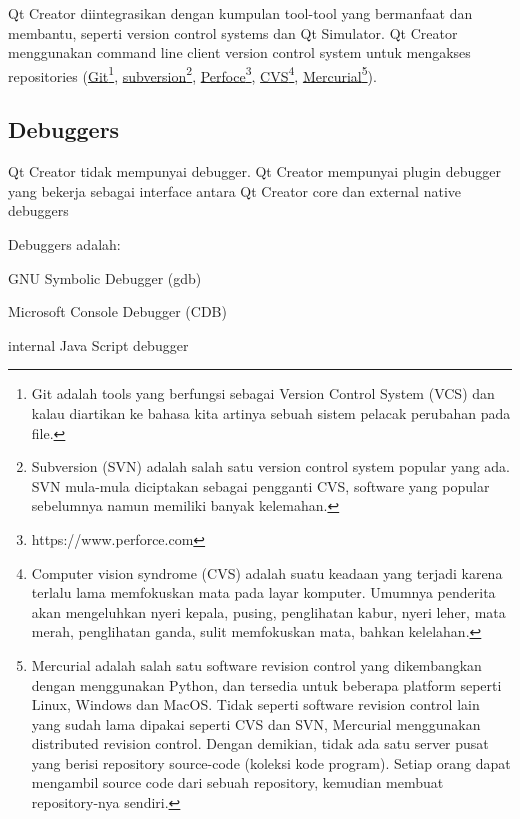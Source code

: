 Qt Creator diintegrasikan dengan kumpulan tool-tool yang bermanfaat dan
membantu, seperti version control systems dan Qt Simulator. Qt Creator
menggunakan command line client version control system untuk mengakses
repositories (\href{https://git-scm.com/}{Git}\footnote{Git adalah tools 
yang berfungsi sebagai Version Control System (VCS) dan kalau diartikan 
ke bahasa kita artinya sebuah sistem pelacak perubahan pada file.},
\href{https://subversion.apache.org/}{subversion}\footnote{Subversion
(SVN) adalah salah satu version control system popular yang ada. 
SVN mula-mula diciptakan sebagai pengganti CVS, software yang 
popular sebelumnya namun memiliki banyak kelemahan.},
\href{https://www.perforce.com}{Perfoce}\footnote{https://www.perforce.com},
\href{www.nongnu.org/cvs/}{CVS}\footnote{Computer vision syndrome (CVS) adalah suatu keadaan yang terjadi karena terlalu lama memfokuskan mata pada layar komputer. Umumnya penderita akan mengeluhkan nyeri kepala, pusing, penglihatan kabur, nyeri leher, mata merah, penglihatan ganda, sulit memfokuskan mata, bahkan kelelahan.},
\href{https://www.mercurial-scm.org}{Mercurial}\footnote{Mercurial adalah salah satu software revision control yang dikembangkan dengan menggunakan Python, dan tersedia untuk beberapa platform seperti Linux, Windows dan MacOS.  Tidak seperti software revision control lain yang sudah lama dipakai seperti CVS dan SVN, Mercurial menggunakan distributed revision control.  Dengan demikian, tidak ada satu server pusat yang berisi repository source-code (koleksi kode program).  Setiap orang dapat mengambil source code dari sebuah repository, kemudian membuat repository-nya sendiri.}).

\subsection{Debuggers}\label{debuggers}

Qt Creator tidak mempunyai debugger. Qt Creator mempunyai plugin
debugger yang bekerja sebagai interface antara Qt Creator core dan
external native debuggers

Debuggers adalah:

\begin{dinglist}{51}

\item
  GNU Symbolic Debugger (gdb)
\item
  Microsoft Console Debugger (CDB)
\item
  internal Java Script debugger
\end{dinglist}

